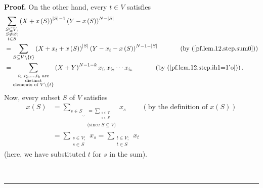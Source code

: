 \documentclass[numbers=enddot,12pt,final,onecolumn,notitlepage]{scrartcl}%
\theoremstyle{definition}
\newenvironment{proof}[1][Proof]{\noindent\textbf{#1.} }{\ \rule{0.5em}{0.5em}}
\let\sumnonlimits\sum
\renewcommand{\sum}{\sumnonlimits\limits}
\newenvironment{verlong}{}{}
\begin{document}
\begin{verlong}
\begin{proof}
On the other hand, every $t\in V$ satisfies%
\begin{align}
&  \sum_{\substack{S\subseteq V;\\S\neq\varnothing;\\t\in S}}\left(
X+x\left(  S\right)  \right)  ^{\left\vert S\right\vert -1}\left(  Y-x\left(
S\right)  \right)  ^{N-\left\vert S\right\vert }\nonumber\\
&  =\sum_{S\subseteq V\setminus\left\{  t\right\}  }\left(  X+x_{t}+x\left(
S\right)  \right)  ^{\left\vert S\right\vert }\left(  Y-x_{t}-x\left(
S\right)  \right)  ^{N-1-\left\vert S\right\vert }\ \ \ \ \ \ \ \ \ \ \left(
\text{by (\ref{pf.lem.12.step.sum0})}\right) \nonumber\\
&  =\sum_{\substack{i_{1},i_{2},\ldots,i_{k}\text{ are}\\\text{distinct}%
\\\text{elements of }V\setminus\left\{  t\right\}  }}\left(  X+Y\right)
^{N-1-k}x_{i_{1}}x_{i_{2}}\cdots x_{i_{k}}\ \ \ \ \ \ \ \ \ \ \left(  \text{by
(\ref{pf.lem.12.step.ih1=1'o})}\right)  . \label{pf.lem.12.step.innersum}%
\end{align}
Now, every subset $S$ of $V$ satisfies%
\begin{align}
x\left(  S\right)   &  =\underbrace{\sum_{s\in S}}_{\substack{=\sum
_{\substack{s\in V;\\s\in S}}\\\text{(since }S\subseteq V\text{)}}%
}x_{s}\ \ \ \ \ \ \ \ \ \ \left(  \text{by the definition of }x\left(
S\right)  \right) \nonumber\\
&  =\sum_{\substack{s\in V;\\s\in S}}x_{s}=\sum_{\substack{t\in V;\\t\in
S}}x_{t} \label{pf.lem.12.step.St}%
\end{align}
(here, we have substituted $t$ for $s$ in the sum).


\end{proof}
\end{verlong}
\end{document}
